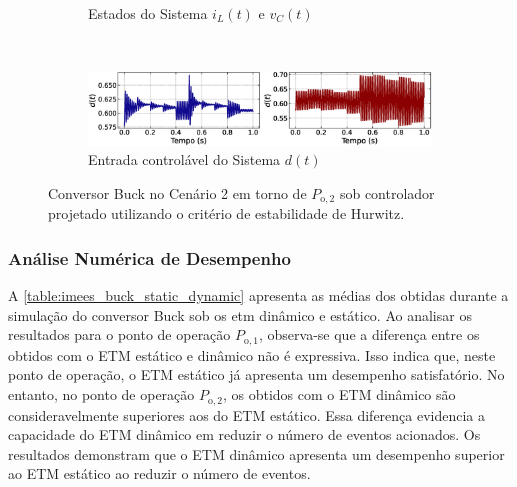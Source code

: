 \begin{figure}[H]
\begin{subfigure}{1.\textwidth}
    \caption{Estados do Sistema $i_L(t)$  e $v_C(t)$}
  \end{subfigure}
  \\[6pt]
  \begin{subfigure}{1.\textwidth}
    \centering
    \includegraphics[width=1.\textwidth]{figuras/classic/buck/sim2/op2/duty-cycle.eps}
    \caption{Entrada controlável do Sistema $d(t)$}
  \end{subfigure}
  \caption{Conversor Buck no Cenário 2 em torno de $P_{\mathrm{o}, 2}$ sob controlador projetado utilizando o critério de estabilidade de Hurwitz.}
  \label{fig:classic_buck_cen2_op2}
\end{figure}


\subsubsection{Análise Numérica de Desempenho}

A \autoref{table:imees_buck_static_dynamic} apresenta as médias dos  obtidas durante a simulação do conversor Buck sob os \acrshort{etm} dinâmico e estático. Ao analisar os resultados para o ponto de operação $P_{\mathrm{o}, 1}$, observa-se que a diferença entre os  obtidos com o ETM estático e dinâmico não é expressiva. Isso indica que, neste ponto de operação, o ETM estático já apresenta um desempenho satisfatório. No entanto, no ponto de operação $P_{\mathrm{o}, 2}$, os  obtidos com o ETM dinâmico são consideravelmente superiores aos do ETM estático. Essa diferença evidencia a capacidade do ETM dinâmico em reduzir o número de eventos acionados. Os resultados demonstram que o ETM dinâmico apresenta um desempenho superior ao ETM estático ao reduzir o número de eventos.

